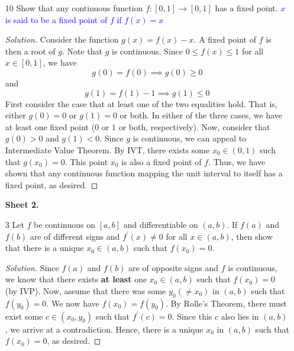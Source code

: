 \documentclass[12pt]{article}
\theoremstyle{definition}
\newenvironment{soln}{\begin{proof}[Solution]}{\end{proof}}
\begin{document}
\begin{enumerate}[leftmargin=*]
    \item[10] Show that any continuous function $f \colon [0,1] \to [0,1]$ has a fixed point. \textcolor{blue}{$x$ is said to be a fixed point of $f$ if $f(x) = x$}
    \begin{soln}
        Consider the function $g(x) = f(x) - x$. A fixed point of $f$ is then a root of $g$. Note that $g$ is continuous. Since $0 \leq f(x) \leq 1$ for all $x \in [0,1]$, we have
        \[
            g(0) = f(0) \implies g(0) \geq 0
        \]
        and
        \[
            g(1) = f(1) - 1 \implies g(1) \leq 0
        \]
        First consider the case that at least one of the two equalities hold. That is, either $g(0) = 0$ or $g(1) = 0$ or both. In either of the three cases, we have at least one fixed point ($0$ or $1$ or both, respectively). Now, consider that $g(0) > 0$ and $g(1) < 0$. Since $g$ is continuous, we can appeal to Intermediate Value Theorem. By IVT, there exists some $x_0 \in (0,1)$ such that $g(x_0) = 0$. This point $x_0$ is also a fixed point of $f$. Thus, we have shown that any continuous function mapping the unit interval to itself has a fixed point, as desired.
    \end{soln}
    
    \newpage
    
    \textbf{Sheet 2.}
    
    \item[3] Let $f$ be continuous on $[a,b]$ and differentiable on $(a,b)$. If $f(a)$ and $f(b)$ are of different signs and $f^{\prime}(x) \neq 0$ for all $x \in (a,b)$, then show that there is a unique $x_0 \in (a,b)$ such that $f(x_0) = 0$. 
    
    \begin{soln}
        Since $f(a)$ and $f(b)$ are of opposite signs and $f$ is continuous, we know that there exists \textbf{at least} one $x_0 \in (a,b)$ such that $f(x_0) = 0$ (by IVP). Now, assume that there was some $y_0 (\neq x_0)$ in $(a,b)$ such that $f(y_0) = 0$. We now have $f(x_0) = f(y_0)$. By Rolle's Theorem, there must exist some $c \in (x_0, y_0)$ such that $f^{\prime}(c) = 0$. Since this $c$ also lies in $(a,b)$, we arrive at a contradiction. Hence, there is a unique $x_0$ in $(a,b)$ such that $f(x_0) = 0$, as desired.
    \end{soln}
    

\end{enumerate}
\end{document}
